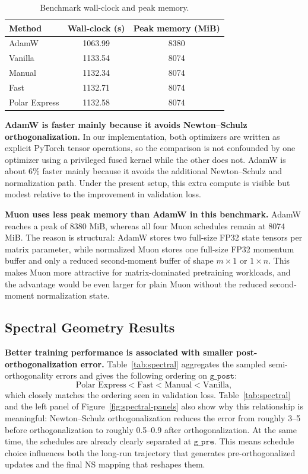\documentclass[10pt]{article}
\begin{document}
\begin{table}[t]
\centering
\caption{Benchmark wall-clock and peak memory.}
\label{tab:bench}
\small
\begin{tabular}{lcc}
\toprule
Method & Wall-clock (s) & Peak memory (MiB) \\
\midrule
AdamW & 1063.99 & 8380 \\
Vanilla & 1133.54 & 8074 \\
Manual & 1132.34 & 8074 \\
Fast & 1132.71 & 8074 \\
Polar Express & 1132.58 & 8074 \\
\bottomrule
\end{tabular}
\end{table}

\textbf{AdamW is faster mainly because it avoids Newton--Schulz orthogonalization.} In our implementation, both optimizers are written as explicit PyTorch tensor operations, so the comparison is not confounded by one optimizer using a privileged fused kernel while the other does not. AdamW is about 6\% faster mainly because it avoids the additional Newton--Schulz and normalization path. Under the present setup, this extra compute is visible but modest relative to the improvement in validation loss.

\textbf{Muon uses less peak memory than AdamW in this benchmark.} AdamW reaches a peak of 8380 MiB, whereas all four Muon schedules remain at 8074 MiB. The reason is structural: AdamW stores two full-size FP32 state tensors per matrix parameter, while normalized Muon stores one full-size FP32 momentum buffer and only a reduced second-moment buffer of shape $m\times 1$ or $1\times n$. This makes Muon more attractive for matrix-dominated pretraining workloads, and the advantage would be even larger for plain Muon without the reduced second-moment normalization state.

\subsection{Spectral Geometry Results}
\textbf{Better training performance is associated with smaller post-orthogonalization error.} Table~\ref{tab:spectral} aggregates the sampled semi-orthogonality errors and gives the following ordering on $\texttt{g\_post}$:
\[
\text{Polar Express} < \text{Fast} < \text{Manual} < \text{Vanilla},
\]
which closely matches the ordering seen in validation loss. Table~\ref{tab:spectral} and the left panel of Figure~\ref{fig:spectral-panels} also show why this relationship is meaningful: Newton--Schulz orthogonalization reduces the error from roughly 3--5 before orthogonalization to roughly 0.5--0.9 after orthogonalization. At the same time, the schedules are already clearly separated at $\texttt{g\_pre}$. This means schedule choice influences both the long-run trajectory that generates pre-orthogonalized updates and the final NS mapping that reshapes them.
\end{document}
